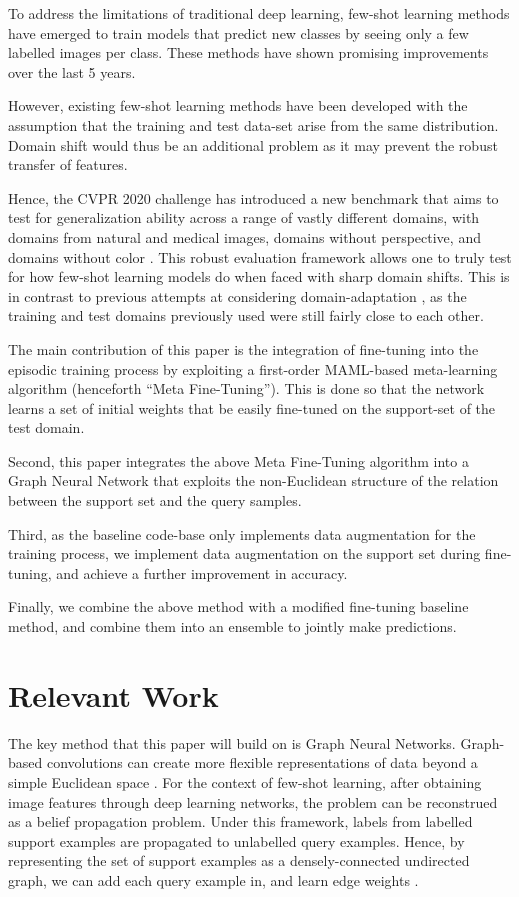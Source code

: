 \documentclass[10pt,twocolumn,letterpaper]{article}
\begin{document}
To address the limitations of traditional deep learning, few-shot learning methods have emerged to train models that predict new classes by seeing only a few labelled images per class. These methods have shown promising improvements over the last 5 years.

However, existing few-shot learning methods have been developed with the assumption that the training and test data-set arise from the same distribution. Domain shift would thus be an additional problem as it may prevent the robust transfer of features. 

Hence, the CVPR 2020 challenge has introduced a new benchmark that aims to test for generalization ability across a range of vastly different domains, with domains from natural and medical images, domains without perspective, and domains without color \cite{guo2019new}. This robust evaluation framework allows one to truly test for how few-shot learning models do when faced with sharp domain shifts. This is in contrast to previous attempts at considering domain-adaptation \cite{chen2019closer}, as the training and test domains previously used were still fairly close to each other.

The main contribution of this paper is the integration of fine-tuning into the episodic training process by exploiting a first-order MAML-based meta-learning algorithm (henceforth ``Meta Fine-Tuning''). This is done so that the network learns a set of initial weights that be easily fine-tuned on the support-set of the test domain. 

Second, this paper integrates the above Meta Fine-Tuning algorithm into a Graph Neural Network that exploits the non-Euclidean structure of the relation between the support set and the query samples.

Third, as the baseline code-base only implements data augmentation for the training process, we implement data augmentation on the support set during fine-tuning, and achieve a further improvement in accuracy.

Finally, we combine the above method with a modified fine-tuning baseline method, and combine them into an ensemble to jointly make predictions.

\section{Relevant Work}

The key method that this paper will build on is Graph Neural Networks. Graph-based convolutions can create more flexible representations of data beyond a simple Euclidean space \cite{bronstein2017geometric}. For the context of few-shot learning, after obtaining image features through deep learning networks, the problem can be reconstrued as a belief propagation problem. Under this framework, labels from labelled support examples are propagated to unlabelled query examples. Hence, by representing the set of support examples as a densely-connected undirected graph, we can add each query example in, and learn edge weights \cite{garcia2017few}.
\end{document}
